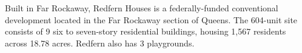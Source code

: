  

Built in Far Rockaway, Redfern Houses is a federally-funded conventional development located in the Far Rockaway section of Queens. The 604-unit site consists of 9 six to seven-story residential buildings, housing 1,567 residents across 18.78 acres. Redfern also has 3 playgrounds. 